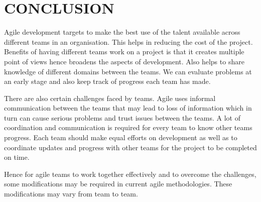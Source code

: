 \documentclass[sigconf]{acmart}
\begin{document}

\section{CONCLUSION}
Agile development targets to make the best use of the talent available across different teams in an organisation. This helps in reducing the cost of the project. Benefits of having different teams work on a project is that it creates multiple point of views hence broadens the aspects of development. Also helps to share knowledge of different domains between the teams. We can evaluate problems at an early stage and also keep track of progress each team has made.

There are also certain challenges faced by teams. Agile uses informal communication between the teams that may lead to loss of information which in turn can cause serious problems and trust issues between the teams. A lot of coordination and communication is required for every team to know other teams progress. Each team should make equal efforts on development as well as to coordinate updates and progress with other teams for the project to be completed on time.

Hence for agile teams to work together effectively and to overcome the challenges, some modifications may be required in current agile methodologies. These modifications may vary from team to team.


%


% 
\appendix
\end{document}

